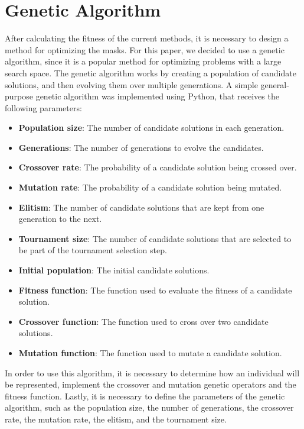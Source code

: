 \documentclass[sigconf,authordraft]{acmart}
\begin{document}
\section{Genetic Algorithm}

After calculating the fitness of the current methods, it is necessary to design a method for optimizing the masks.
For this paper, we decided to use a genetic algorithm, since it is a popular method for optimizing problems with a large search space.
The genetic algorithm works by creating a population of candidate solutions, and then evolving them over multiple generations.
A simple general-purpose genetic algorithm was implemented using Python, that receives the following parameters:

\begin{itemize}
  \item \textbf{Population size}: The number of candidate solutions in each generation.
  \item \textbf{Generations}: The number of generations to evolve the candidates.
  \item \textbf{Crossover rate}: The probability of a candidate solution being crossed over.
  \item \textbf{Mutation rate}: The probability of a candidate solution being mutated.
  \item \textbf{Elitism}: The number of candidate solutions that are kept from one generation to the next.
  \item \textbf{Tournament size}: The number of candidate solutions that are selected to be part of the tournament selection step.
  \item \textbf{Initial population}: The initial candidate solutions.
  \item \textbf{Fitness function}: The function used to evaluate the fitness of a candidate solution.
  \item \textbf{Crossover function}: The function used to cross over two candidate solutions.
  \item \textbf{Mutation function}: The function used to mutate a candidate solution.
\end{itemize}

In order to use this algorithm, it is necessary to determine how an individual will be represented, implement the crossover and mutation genetic operators and the fitness function.
Lastly, it is necessary to define the parameters of the genetic algorithm, such as the population size, the number of generations, the crossover rate, the mutation rate, the elitism, and the tournament size.
\end{document}
